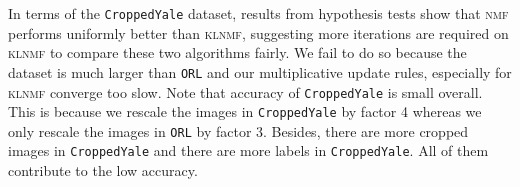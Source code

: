 In terms of the \texttt{CroppedYale} dataset, results from hypothesis tests show that \textsc{nmf} performs uniformly better than \textsc{klnmf}, suggesting more iterations are required on \textsc{klnmf} to compare these two algorithms fairly. We fail to do so because the dataset is much larger than \texttt{ORL} and our multiplicative update rules, especially for \textsc{klnmf} converge too slow. Note that accuracy of \texttt{CroppedYale} is small overall. This is because we rescale the images in \texttt{CroppedYale} by factor 4 whereas we only rescale the images in  \texttt{ORL} by factor 3. Besides, there are more cropped images in  \texttt{CroppedYale} and there are more labels in  \texttt{CroppedYale}. All of them contribute to the low accuracy.
\begin{table}
\caption{Average of evaluations metrics over 10 Monte-Carlo simulations using CroppedYale data set.}
\centering
{}
\end{table}
